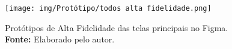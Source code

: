\label{ap:prototipos}

\begin{figure}[H]
    \centering
    \texttt{[image: img/Protótipo/todos alta fidelidade.png]}
    \caption{ Protótipos de Alta Fidelidade das telas principais no Figma. \\
        \textbf{Fonte:} Elaborado pelo autor.}
    \label{fig:prototipo_alta_fidelidade}
\end{figure}